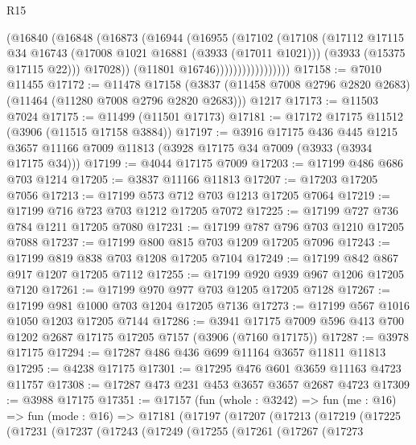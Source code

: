 \begin{lexlean}{R15}
\begin{coremodule}
                          (@16840
                            (@16848
                              (@16873
                                (@16944
                                  (@16955
                                    (@17102
                                      (@17108
                                        (@17112
                                          @17115
                                          @34
                                          @16743
                                          (@17008 @1021 @16881 (@3933 (@17011 @1021)))
                                          (@3933 (@15375 @17115 @22)))
                                        @17028))
                                    (@11801 @16746)))))))))))))))))
@17158 := @7010 @11455
@17172 := @11478
    @17158
    (@3837 (@11458 @7008 @2796 @2820 @2683) (@11464 (@11280 @7008 @2796 @2820 @2683)))
    @1217
@17173 := @11503 @7024
@17175 := @11499 (@11501 @17173)
@17181 := @17172 @17175 @11512 (@3906 (@11515 @17158 @3884))
@17197 := @3916
    @17175
    @436
    @445
    @1215
    @3657
    @11166
    @7009
    @11813
    (@3928 @17175 @34 @7009 (@3933 (@3934 @17175 @34)))
@17199 := @4044 @17175 @7009
@17203 := @17199 @486 @686 @703 @1214
@17205 := @3837 @11166 @11813
@17207 := @17203 @17205 @7056
@17213 := @17199 @573 @712 @703 @1213 @17205 @7064
@17219 := @17199 @716 @723 @703 @1212 @17205 @7072
@17225 := @17199 @727 @736 @784 @1211 @17205 @7080
@17231 := @17199 @787 @796 @703 @1210 @17205 @7088
@17237 := @17199 @800 @815 @703 @1209 @17205 @7096
@17243 := @17199 @819 @838 @703 @1208 @17205 @7104
@17249 := @17199 @842 @867 @917 @1207 @17205 @7112
@17255 := @17199 @920 @939 @967 @1206 @17205 @7120
@17261 := @17199 @970 @977 @703 @1205 @17205 @7128
@17267 := @17199 @981 @1000 @703 @1204 @17205 @7136
@17273 := @17199 @567 @1016 @1050 @1203 @17205 @7144
@17286 := @3941 @17175 @7009 @596 @413 @700 @1202 @2687 @17175 @17205 @7157 (@3906 (@7160 @17175))
@17287 := @3978 @17175
@17294 := @17287 @486 @436 @699 @11164 @3657 @11811 @11813
@17295 := @4238 @17175
@17301 := @17295 @476 @601 @3659 @11163 @4723 @11757
@17308 := @17287 @473 @231 @453 @3657 @3657 @2687 @4723
@17309 := @3988 @17175
@17351 := @17157
    (fun (whole : @3242) =>
    fun (me : @16) =>
    fun (mode : @16) =>
    @17181
      (@17197
        (@17207
          (@17213
            (@17219
              (@17225
                (@17231
                  (@17237
                    (@17243
                      (@17249
                        (@17255
                          (@17261
                            (@17267
                              (@17273

\end{coremodule}
\end{lexlean}

